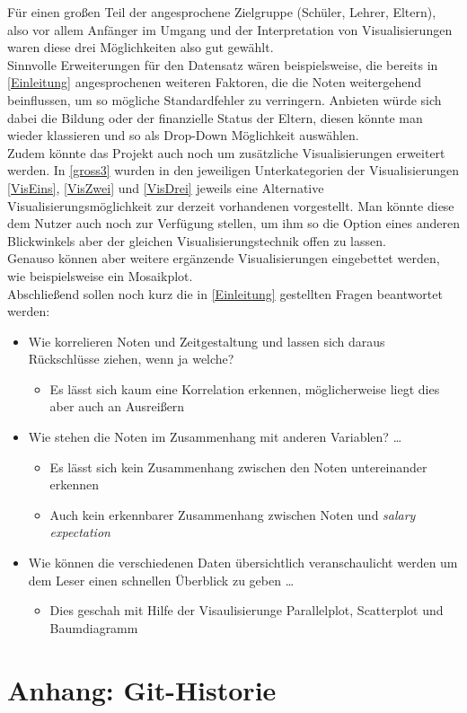 \documentclass[usegeometry=true]{scrartcl}
\begin{document}
\noindent Für einen großen Teil der angesprochene Zielgruppe (Schüler, Lehrer, Eltern), also vor allem Anfänger im Umgang und der Interpretation von Visualisierungen waren diese drei Möglichkeiten also gut gewählt.\\

\noindent Sinnvolle Erweiterungen für den Datensatz wären beispielsweise, die bereits in \ref{Einleitung} angesprochenen weiteren Faktoren, die die Noten weitergehend beinflussen, um so mögliche Standardfehler zu verringern. Anbieten würde sich dabei die Bildung oder der finanzielle Status der Eltern, diesen könnte man wieder klassieren und so als Drop-Down Möglichkeit auswählen.\\ 

\noindent Zudem könnte das Projekt auch noch um zusätzliche Visualisierungen erweitert werden. In \ref{gross3} wurden in den jeweiligen Unterkategorien der Visualisierungen \ref{VisEins}, \ref{VisZwei} und \ref{VisDrei} jeweils eine Alternative Visualisierungsmöglichkeit zur derzeit vorhandenen vorgestellt. Man könnte diese dem Nutzer auch noch zur Verfügung stellen, um ihm so die Option eines anderen Blickwinkels aber der gleichen Visualisierungstechnik offen zu lassen.\\
Genauso können aber weitere ergänzende Visualisierungen eingebettet werden, wie beispielsweise ein Mosaikplot.\\

\noindent Abschließend sollen noch kurz die in \ref{Einleitung} gestellten Fragen beantwortet werden:

\begin{itemize} 
\item Wie korrelieren Noten und Zeitgestaltung und lassen sich daraus Rückschlüsse ziehen, wenn ja welche?
     \begin{itemize}[label=$\star$]
        \item Es lässt sich kaum eine Korrelation erkennen, möglicherweise liegt dies aber auch an 						Ausreißern
     \end{itemize}
\item Wie stehen die Noten im Zusammenhang mit anderen Variablen? \dots{}
	\begin{itemize}[label=$\star$]
        \item Es lässt sich kein Zusammenhang zwischen den Noten untereinander erkennen
        \item Auch kein erkennbarer Zusammenhang zwischen Noten und \textit{salary expectation}
     \end{itemize}
\item Wie können die verschiedenen Daten übersichtlich veranschaulicht werden um dem Leser einen schnellen Überblick zu geben \dots{}
	\begin{itemize}[label=$\star$]
        \item Dies geschah mit Hilfe der Visaulisierunge Parallelplot, Scatterplot und Baumdiagramm
     \end{itemize}
\end{itemize}

\newpage
\printbibliography

\section*{Anhang: Git-Historie}
\end{document}
